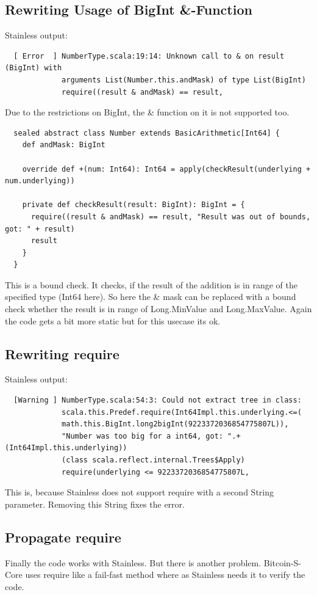 \subsection{Rewriting Usage of BigInt \&-Function}
Stainless output:
\begin{lstlisting}
  [ Error  ] NumberType.scala:19:14: Unknown call to & on result (BigInt) with
             arguments List(Number.this.andMask) of type List(BigInt)
             require((result & andMask) == result,
\end{lstlisting}
Due to the restrictions on BigInt, the \& function on it is not supported too.
\begin{lstlisting}
  sealed abstract class Number extends BasicArithmetic[Int64] {
    def andMask: BigInt

    override def +(num: Int64): Int64 = apply(checkResult(underlying + num.underlying))

    private def checkResult(result: BigInt): BigInt = {
      require((result & andMask) == result, "Result was out of bounds, got: " + result)
      result
    }
  }
\end{lstlisting}
This is a bound check.
It checks, if the result of the addition is in range of the specified type (Int64 here).
So here the \& mask can be replaced with a bound check whether the result is in range of Long.MinValue and Long.MaxValue.
Again the code gets a bit more static but for this usecase its ok.

\subsection{Rewriting require}
Stainless output:
\begin{lstlisting}
  [Warning ] NumberType.scala:54:3: Could not extract tree in class:
             scala.this.Predef.require(Int64Impl.this.underlying.<=(
             math.this.BigInt.long2bigInt(9223372036854775807L)),
             "Number was too big for a int64, got: ".+(Int64Impl.this.underlying))
             (class scala.reflect.internal.Trees$Apply)
             require(underlying <= 9223372036854775807L,
\end{lstlisting}
This is, because Stainless does not support require with a second String parameter.
Removing this String fixes the error.

\subsection{Propagate require}
Finally the code works with Stainless.
But there is another problem.
Bitcoin-S-Core uses require like a fail-fast method where as Stainless needs it to verify the code.


